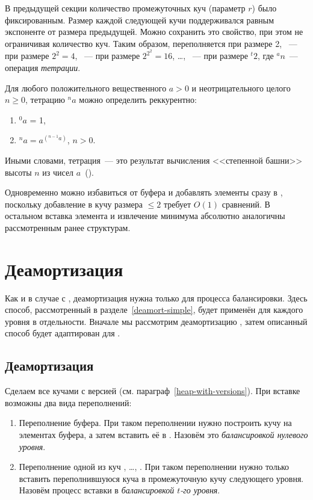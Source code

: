 В предыдущей секции количество промежуточных куч (параметр $r$) было фиксированным.
Размер каждой следующей кучи поддерживался равным экспоненте от размера
предыдущей. Можно сохранить это свойство, при этом не ограничивая количество куч.
Таким образом, \MH[1] переполняется при размере 2, \MH[2]~--- при размере $2^2 = 4$,
\MH[3]~--- при размере $2^{2^2} = 16$, \dots, \MH[t]~--- при размере ${}^{t}2$,
где ${}^{a}n$~--- операция \emph{тетрации}.

\begin{definition}
Для любого положительного вещественного $a > 0$ и неотрицательного целого $n \geq 0$,
тетрацию ${}^na$ можно определить реккурентно:
\begin{enumerate}
\item ${}^0a$ = 1,
\item ${}^na = a^{({}^{n-1}a)}$, $n > 0$.
\end{enumerate}
Иными словами, тетрация~--- это результат вычисления <<степенной башни>> высоты $n$
из чисел $a$~(\cite{tetration}).
\end{definition}

Одновременно можно избавиться от буфера и добавлять элементы сразу в \MH[1], поскольку
добавление в кучу размера $\leq 2$ требует $O(1)$ сравнений. В остальном
вставка элемента и извлечение минимума абсолютно аналогичны рассмотренным ранее структурам.

\section{Деамортизация}
Как и в случае с \SCH, деамортизация нужна только для процесса балансировки.
Здесь способ, рассмотренный в разделе~\ref{deamort-simple}, будет применён для
каждого уровня в отдельности. Вначале мы рассмотрим деамортизацию \CH[r],
затем описанный способ будет адаптирован для \CH[*].

\subsection{Деамортизация \CH[r]}

Сделаем все \MH[t] кучами с версией (см. параграф~\ref{heap-with-versions}).
При вставке возможны два вида переполнений:
\begin{enumerate}
\item Переполнение буфера. При таком переполнении нужно построить кучу на элементах
    буфера, а затем вставить её в \MH[1]. Назовём это \emph{балансировкой нулевого уровня}.
\item Переполнение одной из куч \MH[1], \dots, \MH[r-1]. При таком переполнении
    нужно только вставить переполнившуюся куча в промежуточную кучу следующего
    уровня. Назовём процесс вставки \MH[t] в \MH[t+1] \emph{балансировкой $t$-го уровня}.
\end{enumerate}


